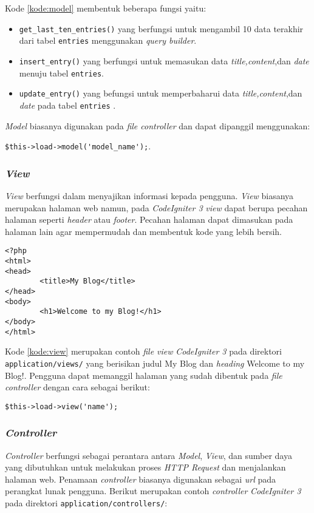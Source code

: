 Kode \ref{kode:model} membentuk beberapa fungsi yaitu:
\begin{itemize}
\item \verb|get_last_ten_entries()| yang berfungsi untuk mengambil 10 data terakhir dari tabel \verb|entries| menggunakan \textit{query builder}.
\item \verb|insert_entry()| yang berfungsi untuk memasukan data \textit{title,content},dan \textit{date} menuju tabel \verb|entries|.
\item \verb|update_entry()| yang befungsi untuk memperbaharui data \textit{title,content},dan \textit{date} pada tabel \verb|entries| .
\end{itemize}
\textit{Model} biasanya digunakan pada \textit{file controller} dan dapat dipanggil menggunakan: 
\begin{center}
\verb|$this->load->model('model_name');|.
\end{center}

\subsubsection{\textit{\textbf{View}}}
\textit{View} berfungsi dalam menyajikan informasi kepada pengguna. \textit{View} biasanya merupakan halaman web namun, pada \textit{CodeIgniter 3} \textit{view} dapat berupa pecahan halaman seperti \textit{header} atau \textit{footer}. Pecahan halaman dapat dimasukan pada halaman lain agar mempermudah dan membentuk kode yang lebih bersih.

\begin{lstlisting}[caption=Contoh \textit{view} pada \textit{CodeIgniter 3}, label=kode:view]
<?php
<html>
<head>
        <title>My Blog</title>
</head>
<body>
        <h1>Welcome to my Blog!</h1>
</body>
</html>
\end{lstlisting}

Kode \ref{kode:view} merupakan contoh \textit{file view} \textit{CodeIgniter 3} pada direktori \verb|application/views/| yang berisikan judul My Blog dan \textit{heading} Welcome to my Blog!. Pengguna dapat memanggil halaman yang sudah dibentuk pada \textit{file controller} dengan cara sebagai berikut:

\begin{center}
\verb|$this->load->view('name');|
\end{center}

\subsubsection{\textit{\textbf{Controller}}} 
\textit{Controller} berfungsi sebagai perantara antara \textit{Model}, \textit{View}, dan sumber daya yang dibutuhkan untuk melakukan proses \textit{HTTP Request} dan menjalankan halaman web. Penamaan \textit{controller} biasanya digunakan sebagai \textit{url} pada perangkat lunak pengguna. Berikut merupakan contoh \textit{controller} \textit{CodeIgniter 3} pada direktori \verb|application/controllers/|:

